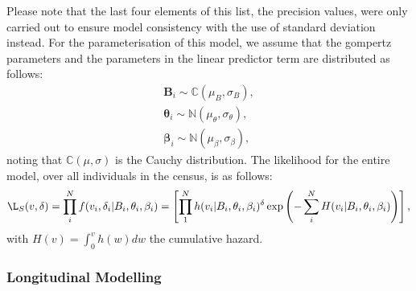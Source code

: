 \documentclass[
]{article}
\begin{document}
Please note that the last four elements of this list, the precision
values, were only carried out to ensure model consistency with the use
of standard deviation instead. For the parameterisation of this model,
we assume that the gompertz parameters and the parameters in the linear
predictor term are distributed as follows:
\begin{equation}\label{priorsS}
\begin{aligned}
  \boldsymbol{B}_i\sim\mathbb{C}(\mu_B,\sigma_B),\\
  \boldsymbol{\theta}_i\sim\mathbb{N}(\mu_\theta,\sigma_\theta),\\
  \boldsymbol{\beta}_i\sim \mathbb{N}(\mu_\beta,\sigma_\beta),
\end{aligned}
\end{equation} noting that \(\mathbb{C}(\mu,\sigma)\) is the Cauchy
distribution. The likelihood for the entire model, over all individuals
in the census, is as follows: \begin{equation}\label{likesurv}
\L_S(v,\delta)=\prod_i^N f(v_i,\delta_i|B_i,\theta_i,\beta_i)=\left[ \prod_1^N h(v_i|B_i,\theta_i,\beta_i)^\delta \exp{\left( -\sum_i^N H(v_i|B_i,\theta_i,\beta_i) \right)} \right],
\end{equation} with \(H(v)=\int_0^v h(w)dw\) the cumulative hazard.

\hypertarget{longitudinal-modelling}{%
\subsubsection{Longitudinal Modelling}\label{longitudinal-modelling}}
\end{document}
